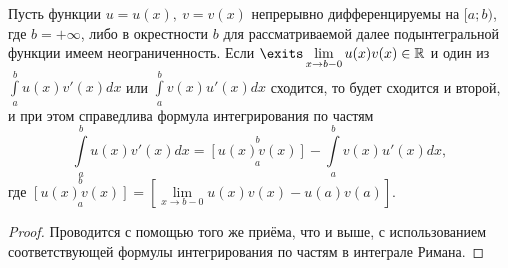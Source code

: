 \documentclass[../../main.tex]{subfiles}
\begin{document}
\begin{thm}
	Пусть функции $u = u(x),\ v = v(x)$ непрерывно дифференцируемы на  $[a; b)$,
	где $ b = +\infty $, либо в окрестности $ b $ для рассматриваемой далее
	подынтегральной функции имеем неограниченность. Если
	$\exits \lim\limits_{x \to b - 0} u(x)v(x) \in \R$ и один из
	$\int\limits_a^bu(x)v'(x)dx$ или $ \int\limits_a^bv(x)u'(x)dx$
	сходится, то будет сходится и второй, и при этом справедлива 
	формула интегрирования по частям
	\begin{equation}
		\label{lec9:3}
		\int\limits_a^b u(x)v'(x) dx = \left[
		u(x)v(x)\right]\limits_a^b - 
		\int\limits_a^b v(x)u'(x) dx,
	\end{equation}
	где $ \left[u(x)v(x)\right]\limits_a^b = \left[
	\lim\limits_{x \to b - 0} u(x)v(x) -
	u(a)v(a) \right]$.
\end{thm}
\begin{proof}
	Проводится с помощью того же приёма, что и выше, с использованием 
	соответствующей формулы интегрирования по частям в интеграле Римана.
\end{proof}
\end{document}
